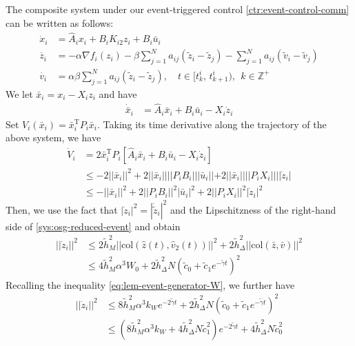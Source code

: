 \documentclass[sort&compress]{IEEEtran}
\renewcommand{\top}{{\mathrm{T}}}
\begin{document}
The composite system under our event-triggered control \eqref{ctr:event-control-comm} can be written as follows:
\begin{align*}
	\dot{x}_i&=\hat A_ix_i+B_iK_{i2} z_i+B_i\bar u_i \nonumber\\
	\dot{z_i}&= -\alpha \nabla f_i(z_i)-\beta \sum_{j=1}^{N}a_{ij}(\tilde  z_i- \tilde z_j)-\sum_{j=1}^{N} a_{ij}(\tilde v_i-\tilde v_j) \nonumber \\
	\dot{v_i}&=\alpha \beta \sum_{j=1}^{N}a_{ij}(\tilde z_i- \tilde z_j),\quad t\in [t^i_k,\,t^i_{k+1}),~~ k\in \mathbb{Z}^+ 
\end{align*}
We let $\bar x_i=x_i-X_i z_i$ and have 
\begin{align*}
	\dot{\bar x}_i&=\hat A_i \bar x_i+ B_i\bar u_i -X_i \dot{z}_i
\end{align*}
Set $V_i(\bar x_i)=\bar x_i^\top P_i \bar x_i$. Taking its time derivative along the trajectory of the above system, we have 
\begin{align*}
	\dot{V}_i&=2\bar x_i^\top P_i [\hat A_i \bar x_i+ B_i\bar u_i -X_i \dot{z}_i]\nonumber \\
	&\leq -2||\bar x_i||^2+2||\bar x_i||||P_iB_i|||\bar u_i||+2||\bar x_i||||P_iX_i||||\dot{z}_i| \nonumber \\
	& \leq -||\bar x_i||^2+ 2||P_iB_i||^2|\bar u_i|^2+ 2||P_iX_i||^2|\dot{z}_i|^2
\end{align*}
Then, we use the fact that $|\dot{z}_i|^2=|\dot{\tilde z}_i|^2$ and the Lipschitzness of the right-hand side of \eqref{sys:osg-reduced-event} and obtain 
\begin{align*}
	||\dot{z}_i||^2 &\leq 2\tilde h_M^2 ||\mbox{col}(\hat {z}(t),\hat{v}_2(t))||^2+2\tilde h_\Delta^2 ||\mbox{col}(\bar {z},\bar{v})||^2\\
	&\leq 4\tilde h_M^2 \alpha^3 W_0+2\tilde h_\Delta^2 N (\tilde c_0+\tilde c_1 e^{-\tilde \gamma t})^2
\end{align*}
Recalling the inequality \eqref{eq:lem-event-generator-W}, we further have 
\begin{align}\label{eq:thm-z}
	||\dot{z}_i||^2 & \leq 8\tilde h_M^2 \alpha^3 k_{W} e^{-2\tilde \gamma t} +2\tilde h_\Delta^2 N (\tilde c_0+\tilde c_1 e^{-\tilde \gamma t})^2 \nonumber\\
	&\leq (8\tilde h_M^2 \alpha^3 k_{W}+4\tilde h_\Delta^2 N\tilde c_1^2)  e^{-2\tilde \gamma t} + 4\tilde h_\Delta^2 N  \tilde c_0^2
\end{align}
\end{document}
